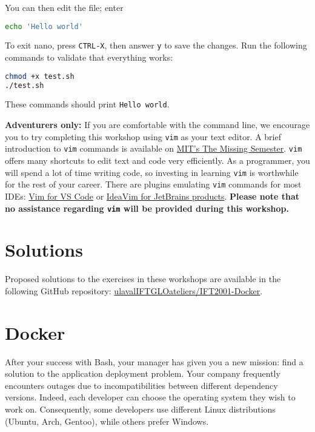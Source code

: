 \documentclass[french]{article}
\begin{document}
You can then edit the file; enter

\begin{lstlisting}[language=bash]
echo 'Hello world'
\end{lstlisting}

To exit nano, press \texttt{CTRL-X}, then answer \texttt{y} to save the changes.
Run the following commands to validate that everything works:

\begin{lstlisting}[language=bash]
chmod +x test.sh
./test.sh
\end{lstlisting}

These commands should print \texttt{Hello world}.

\textbf{Adventurers only:} If you are comfortable with the command line, we encourage you to try completing this workshop using \texttt{vim} as your text editor.
A brief introduction to \texttt{vim} commands is available on \href{https://missing.csail.mit.edu/2020/editors/}{MIT's The Missing Semester}.
\texttt{vim} offers many shortcuts to edit text and code very efficiently.
As a programmer, you will spend a lot of time writing code, so investing in learning \texttt{vim} is worthwhile for the rest of your career.
There are plugins emulating \texttt{vim} commands for most IDEs: \href{https://marketplace.visualstudio.com/items?itemName=vscodevim.vim}{Vim for VS Code} or \href{https://plugins.jetbrains.com/plugin/164-ideavim}{IdeaVim for JetBrains products}.
\textbf{Please note that no assistance regarding \texttt{vim} will be provided during this workshop.}

\section{Solutions}
Proposed solutions to the exercises in these workshops are available in the following GitHub repository: \href{https://github.com/ulavalIFTGLOateliers/IFT2001-Docker}{ulavalIFTGLOateliers/IFT2001-Docker}.

\newpage
\section{Docker}

After your success with Bash, your manager has given you a new mission: find a solution to the application deployment problem.
Your company frequently encounters outages due to incompatibilities between different dependency versions.
Indeed, each developer can choose the operating system they wish to work on.
Consequently, some developers use different Linux distributions (Ubuntu, Arch, Gentoo), while others prefer Windows.
\end{document}
